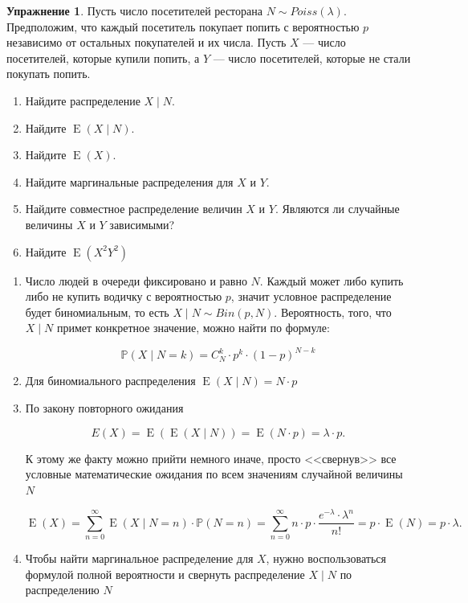 \documentclass[12pt, a4paper, oneside]{extreport}
\DeclareMathOperator{\E}{\mathop{E}}
\def \mbb{\mathbb}
\def \PP{\mbb{P}}
\theoremstyle{plain}              %
\theoremstyle{definition}         %
\newtheorem{problem}{\color{myblue} Упражнение}
\begin{document}
\begin{problem}
Пусть число посетителей ресторана $N \sim Poiss(\lambda)$.  Предположим, что каждый посетитель покупает попить с вероятностью $p$ независимо от остальных покупателей и их числа. Пусть $X$ --- число посетителей, которые купили попить, а $Y$ --- число посетителей, которые не стали покупать попить.  

\begin{enumerate} 
\item Найдите распределение $X \mid N$.
\item Найдите $\E(X \mid N)$.
\item Найдите $\E(X)$.
\item Найдите маргинальные распределения для $X$ и $Y$.
\item Найдите совместное распределение величин $X$ и $Y$. Являются ли случайные величины $X$ и $Y$ зависимыми? 
\item Найдите $\E(X^2Y^2)$
\end{enumerate} 	

\begin{sol} 
\begin{enumerate}
	\item  Число людей в очереди фиксировано и равно $N$. Каждый может либо купить либо не купить водичку с вероятностью $p$, значит условное распределение будет биномиальным, то есть $X \mid N \sim Bin(p, N)$. Вероятность, того, что $X \mid N$ примет конкретное значение, можно найти по формуле: 
	
	\[ \PP(X \mid N = k) = C_{N}^k \cdot p^k \cdot (1-p)^{N-k} \] 
	
	\item  Для биномиального распределения $\E(X \mid N) = N \cdot p$ 
	\item  По закону повторного ожидания 
	
	\[ E(X) = \E(\E(X \mid N)) = \E(N \cdot p) = \lambda \cdot p. \]
	
	К этому же факту можно прийти немного иначе, просто <<свернув>> все условные математические ожидания по всем значениям случайной величины $N$ 
	
	\[\E(X) = \sum_{n=0}^{\infty} \E(X \mid N =n) \cdot \PP(N = n) = \sum_{n=0}^{\infty} n\cdot p \cdot \frac{e^{-\lambda} \cdot \lambda^n}{n!} = p \cdot \E(N) = p \cdot \lambda. \]
	
	\item Чтобы найти маргинальное распределение для $X$, нужно воспользоваться формулой полной вероятности и свернуть распределение $X  \mid  N$ по распределению $N$
	

\end{enumerate}
\end{sol}
\end{problem}
\end{document}
